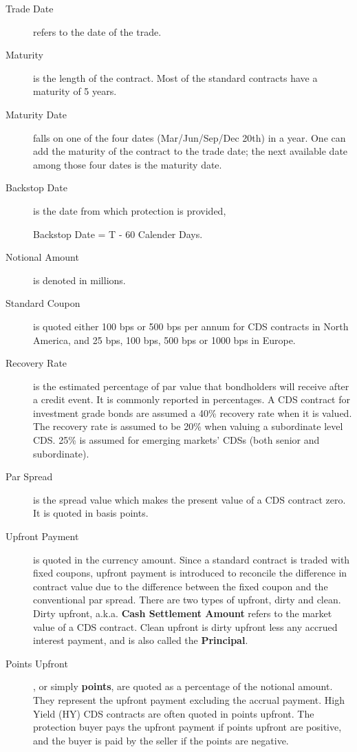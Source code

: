 \documentclass[a4paper]{article}
\begin{document}
\begin{description}
\item [Trade Date] refers to the date of the trade.
\item [Maturity] is the length of the contract. Most of the standard
  contracts have a maturity of 5 years.
\item [Maturity Date] falls on one of the four dates (Mar/Jun/Sep/Dec
  20th) in a year. One can add the maturity of the contract to the
  trade date; the next available date among those four dates is the
  maturity date.
\item [Backstop Date] is the date from which protection is
  provided,
  \begin{center}
    Backstop Date = T - 60 Calender Days.
  \end{center}
\item [Notional Amount] is denoted in millions.
\item [Standard Coupon] is quoted either 100 bps or 500 bps per
  annum for CDS contracts in North America, and 25 bps, 100 bps, 500
  bps or 1000 bps in Europe.
\item [Recovery Rate] is the estimated percentage of par value that
  bondholders will receive after a credit event. It is commonly
  reported in percentages. A CDS contract for investment grade bonds
  are assumed a 40\% recovery rate when it is valued. The recovery
  rate is assumed to be 20\% when valuing a subordinate level
  CDS. 25\% is assumed for emerging markets' CDSs (both senior and
  subordinate).
\item [Par Spread] is the spread value which makes the present value
  of a CDS contract zero. It is quoted in basis points.  
\item [Upfront Payment] is quoted in the currency amount. Since a
  standard contract is traded with fixed coupons, upfront payment is
  introduced to reconcile the difference in contract value due to the
  difference between the fixed coupon and the conventional par
  spread. There are two types of upfront, dirty and clean. Dirty
  upfront, a.k.a. \textbf{Cash Settlement Amount} refers to the market
  value of a CDS contract. Clean upfront is dirty upfront less any
  accrued interest payment, and is also called the \textbf{Principal}.
\item [Points Upfront], or simply \textbf{points}, are quoted as a
  percentage of the notional amount. They represent the upfront
  payment excluding the accrual payment. High Yield (HY) CDS contracts
  are often quoted in points upfront. The protection buyer pays the
  upfront payment if points upfront are positive, and the buyer is
  paid by the seller if the points are negative.
\end{description}
\end{document}
